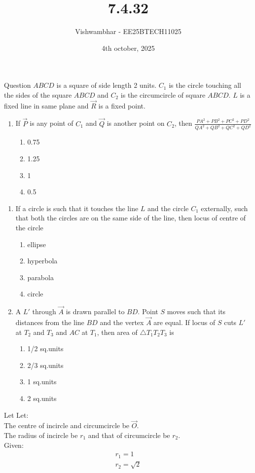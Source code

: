 \documentclass{beamer}
\title{7.4.32}
\date{4th october, 2025}
\author{Vishwambhar - EE25BTECH11025}
\begin{document}
\frame{\titlepage}
\begin{frame}{Question}
$ABCD$ is a square of side length 2 units. $C_1$ is the circle touching all the sides of the square $ABCD$ and $C_2$ is the circumcircle of square $ABCD$. $L$ is a fixed line in same plane and $\vec{R}$ is a fixed point.\\
\begin{enumerate}
    \item If $\vec{P}$ is any point of $C_1$ and $\vec{Q}$ is another point on $C_2$, then $\frac{PA^2+PB^2+PC^2+PD^2}{QA^2+QB^2+QC^2+QD^2}$
    \begin{enumerate}
        \item 0.75
        \item 1.25
        \item 1
        \item 0.5
    \end{enumerate}
    \end{enumerate}
    \end{frame}
    \begin{frame}
    \begin{enumerate}
    \item If a circle is such that it touches the line $L$ and the circle $C_1$ externally, such that both the circles are on the same side of the line, then locus of centre of the circle
    \begin{enumerate}
        \item ellipse
        \item hyperbola
        \item parabola
        \item circle
    \end{enumerate}
    \item A $L'$ through $\vec{A}$ is drawn parallel to $BD$. Point $S$ moves such that its distances from the line $BD$ and the vertex $\vec{A}$ are equal. If locus of $S$ cuts $L'$ at $T_2$ and $T_3$ and $AC$ at $T_1$, then area of $\triangle T_1T_2T_3$ is
    \begin{enumerate}
        \item 1/2 sq.units
        \item 2/3 sq.units
        \item 1 sq.units
        \item 2 sq.units
    \end{enumerate}
\end{enumerate}
\end{frame}
\begin{frame}{Let}
Let:\\
The centre of incircle and circumcircle be $\vec{O}$.\\
The radius of incircle be $r_1$ and that of circumcircle be $r_2$.\\
Given:
\begin{align}
    r_1 = 1\\
    r_2 = \sqrt{2}
\end{align}
\end{frame}
\end{document}
